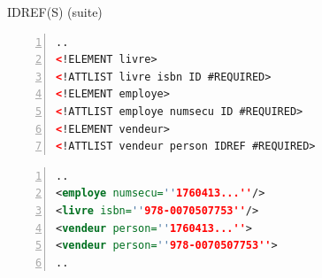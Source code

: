 \begin{frame}[containsverbatim]{IDREF(S) (suite)}
\begin{minipage}{0.7\textwidth}

\vspace{-0.5cm}
\begin{lstlisting}[basicstyle=\footnotesize, language=XML,breaklines=true,numbers=left, label={dtdpersons1}, caption={Bout de déclaration dans une DTD}]
..
<!ELEMENT livre>
<!ATTLIST livre isbn ID #REQUIRED>
<!ELEMENT employe>
<!ATTLIST employe numsecu ID #REQUIRED>
<!ELEMENT vendeur>
<!ATTLIST vendeur person IDREF #REQUIRED>
\end{lstlisting}
\end{minipage}

\vspace{-0.7cm}

\begin{flushright}
\begin{minipage}{0.5\textwidth}
\begin{lstlisting}[basicstyle=\footnotesize, language=XML,breaklines=true,numbers=left, label={docpersons1}, caption={Bout d'instance}]
..
<employe numsecu=''1760413...''/>
<livre isbn=''978-0070507753''/>
<vendeur person=''1760413...''>
<vendeur person=''978-0070507753''>
..
\end{lstlisting}
\end{minipage}
\end{flushright}
 
\vspace{-0.5cm}

\end{frame}


